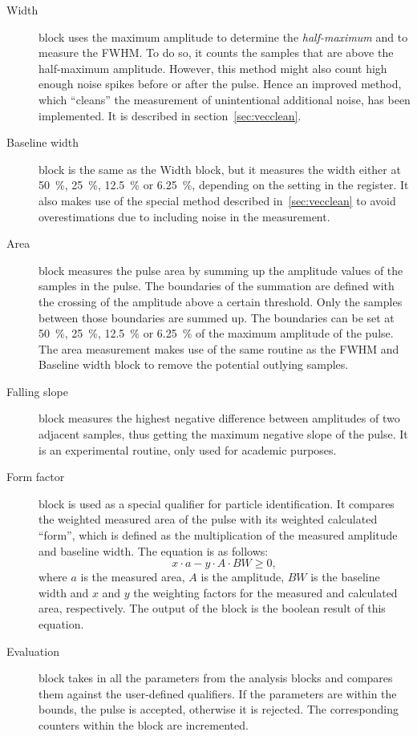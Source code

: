 \begin{description}
\item[Width] block uses the maximum amplitude to determine the \emph{half-maximum} and to measure the FWHM. To do so, it counts the samples that are above the half-maximum amplitude. However, this method might also count high enough noise spikes before or after the pulse. Hence an improved method, which ``cleans'' the measurement of unintentional additional noise, has been implemented. It is described in section~\ref{sec:vecclean}.
\item[Baseline width] block is the same as the Width block, but it measures the width either at 50~\%, 25~\%, 12.5~\% or 6.25~\%, depending on the setting in the register. It also makes use of the special method described in~\ref{sec:vecclean} to avoid overestimations due to including noise in the measurement.
\item[Area] block measures the pulse area by summing up the amplitude values of the samples in the pulse. The boundaries of the summation are defined with the crossing of the amplitude above a certain threshold. Only the samples between those boundaries are summed up. The boundaries can be set at  50~\%, 25~\%, 12.5~\% or 6.25~\% of the maximum amplitude of the pulse. The area measurement makes use of the same routine as the FWHM and Baseline width block to remove the potential outlying samples.

\item[Falling slope] block measures the highest negative difference between amplitudes of two adjacent samples, thus getting the maximum negative slope of the pulse. It is an experimental routine, only used for academic purposes.
\item[Form factor] block is used as a special qualifier for particle identification. It compares the weighted measured area of the pulse with its weighted calculated ``form'', which is defined as the multiplication of the measured amplitude and baseline width. The equation is as follows:
\begin{equation}
\label{eq:formfactor1}
x\cdot a - y \cdot A \cdot BW \geq 0,
\end{equation}
where $a$ is the measured area, $A$ is the amplitude, $BW$ is the baseline width and $x$ and $y$ the weighting factors for the measured and calculated area, respectively. The output of the block is the boolean result of this equation.
\item[Evaluation] block takes in all the parameters from the analysis blocks and compares them against the user-defined qualifiers. If the parameters are within the bounds, the pulse is accepted, otherwise it is rejected. The corresponding counters within the block are incremented.

\end{description}


